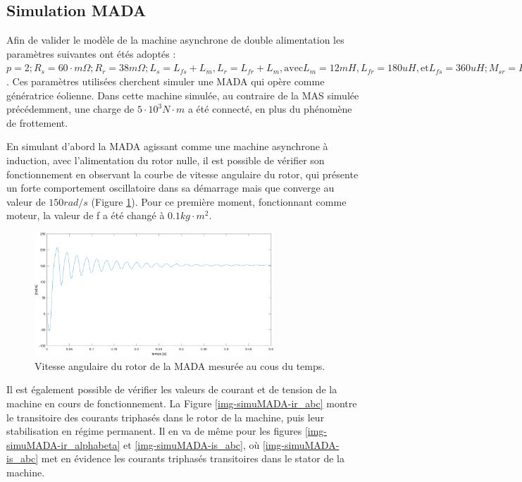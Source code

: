 \FloatBarrier
\subsection{Simulation MADA}

Afin de valider le modèle de la machine asynchrone de double alimentation les paramètres suivantes ont étés adoptés : $p = 2; R_s = 60 \cdot m\Omega; R_r = 38 m\Omega; L_s = L_{fs} + L_m, L_r = L_{fr} + L_m, \text{avec} L_m=12mH, L_{fr} = 180uH, \text{et} L_{fs}= 360uH; M_{sr} = L_m; f = -22 kg \cdot m^2 \cdot s^-1; J = 0.4 kg \cdot m^2$. Ces paramètres utilisées cherchent simuler une MADA qui opère comme génératrice éolienne. Dans cette machine simulée, au contraire de la MAS simulée précédemment, une charge de $5 \cdot 10^3 N\cdot m$ a été connecté, en plus du phénomène de frottement. 

En simulant d'abord la MADA agissant comme une machine asynchrone à induction, avec l'alimentation du rotor nulle, il est possible de vérifier son fonctionnement en observant la courbe de vitesse angulaire du rotor, qui présente un forte comportement oscillatoire dans sa démarrage mais que converge au valeur de $150 rad/s$ (Figure \ref{img-simuMADA-wm}). Pour ce première moment, fonctionnant comme moteur, la valeur de f a été changé à $0.1 kg \cdot m^2$. 


\begin{figure}[!h]
    \centering
    \includegraphics[width=0.8\textwidth]{simusMATLAB/MADA/wm.png} 
    \caption{Vitesse angulaire du rotor de la MADA mesurée au cous du temps.}
    \label{img-simuMADA-wm}
\end{figure}

Il est également possible de vérifier les valeurs de courant et de tension de la machine en cours de fonctionnement. La Figure \ref{img-simuMADA-ir_abc} montre le transitoire des courants triphasés dans le rotor de la machine, puis leur stabilisation en régime permanent. Il en va de même pour les figures \ref{img-simuMADA-ir_alphabeta} et \ref{img-simuMADA-is_abc}, où \ref{img-simuMADA-is_abc} met en évidence les courants triphasés transitoires dans le stator de la machine. 


